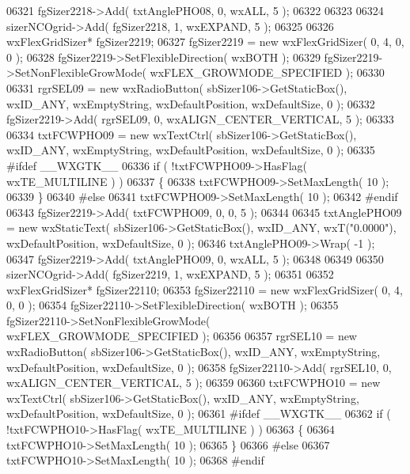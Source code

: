 \begin{DoxyCode}
06321     fgSizer2218->Add( txtAnglePHO08, 0, wxALL, 5 );
06322     
06323     
06324     sizerNCOgrid->Add( fgSizer2218, 1, wxEXPAND, 5 );
06325     
06326     wxFlexGridSizer* fgSizer2219;
06327     fgSizer2219 = \textcolor{keyword}{new} wxFlexGridSizer( 0, 4, 0, 0 );
06328     fgSizer2219->SetFlexibleDirection( wxBOTH );
06329     fgSizer2219->SetNonFlexibleGrowMode( wxFLEX\_GROWMODE\_SPECIFIED );
06330     
06331     rgrSEL09 = \textcolor{keyword}{new} wxRadioButton( sbSizer106->GetStaticBox(), wxID\_ANY, wxEmptyString, wxDefaultPosition, 
      wxDefaultSize, 0 );
06332     fgSizer2219->Add( rgrSEL09, 0, wxALIGN\_CENTER\_VERTICAL, 5 );
06333     
06334     txtFCWPHO09 = \textcolor{keyword}{new} wxTextCtrl( sbSizer106->GetStaticBox(), wxID\_ANY, wxEmptyString, wxDefaultPosition, 
      wxDefaultSize, 0 );
06335 \textcolor{preprocessor}{    #ifdef \_\_WXGTK\_\_}
06336     \textcolor{keywordflow}{if} ( !txtFCWPHO09->HasFlag( wxTE\_MULTILINE ) )
06337     \{
06338     txtFCWPHO09->SetMaxLength( 10 );
06339     \}
06340 \textcolor{preprocessor}{    #else}
06341     txtFCWPHO09->SetMaxLength( 10 );
06342 \textcolor{preprocessor}{    #endif}
06343     fgSizer2219->Add( txtFCWPHO09, 0, 0, 5 );
06344     
06345     txtAnglePHO09 = \textcolor{keyword}{new} wxStaticText( sbSizer106->GetStaticBox(), wxID\_ANY, wxT(\textcolor{stringliteral}{"0.0000"}), 
      wxDefaultPosition, wxDefaultSize, 0 );
06346     txtAnglePHO09->Wrap( -1 );
06347     fgSizer2219->Add( txtAnglePHO09, 0, wxALL, 5 );
06348     
06349     
06350     sizerNCOgrid->Add( fgSizer2219, 1, wxEXPAND, 5 );
06351     
06352     wxFlexGridSizer* fgSizer22110;
06353     fgSizer22110 = \textcolor{keyword}{new} wxFlexGridSizer( 0, 4, 0, 0 );
06354     fgSizer22110->SetFlexibleDirection( wxBOTH );
06355     fgSizer22110->SetNonFlexibleGrowMode( wxFLEX\_GROWMODE\_SPECIFIED );
06356     
06357     rgrSEL10 = \textcolor{keyword}{new} wxRadioButton( sbSizer106->GetStaticBox(), wxID\_ANY, wxEmptyString, wxDefaultPosition, 
      wxDefaultSize, 0 );
06358     fgSizer22110->Add( rgrSEL10, 0, wxALIGN\_CENTER\_VERTICAL, 5 );
06359     
06360     txtFCWPHO10 = \textcolor{keyword}{new} wxTextCtrl( sbSizer106->GetStaticBox(), wxID\_ANY, wxEmptyString, wxDefaultPosition, 
      wxDefaultSize, 0 );
06361 \textcolor{preprocessor}{    #ifdef \_\_WXGTK\_\_}
06362     \textcolor{keywordflow}{if} ( !txtFCWPHO10->HasFlag( wxTE\_MULTILINE ) )
06363     \{
06364     txtFCWPHO10->SetMaxLength( 10 );
06365     \}
06366 \textcolor{preprocessor}{    #else}
06367     txtFCWPHO10->SetMaxLength( 10 );
06368 \textcolor{preprocessor}{    #endif}

\end{DoxyCode}

